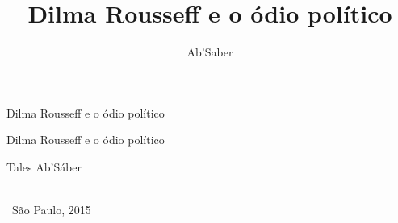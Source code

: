 \documentclass[showtrims,12pt]{memoir}
\author{Ab'Saber}
\title{Dilma Rousseff e o \'odio pol\'itico}
\begin{document}
\fontsize{13.5pt}{17.6}\selectfont
{}

\pagestyle{empty}

{\LARGE\centering\vspace*{6em}\thispagestyle{empty}
Dilma Rousseff e o \'odio pol\'itico\\

\vfill\pagebreak\par}

\blank

{\LARGE\centering\vspace*{6em}\thispagestyle{empty}
Dilma Rousseff e o \'odio pol\'itico\\\bigskip

\Large Tales Ab'S\'aber\\\bigskip


\vfill
\logoum\\
\ S\~ao Paulo, 2015
\pagebreak\par}




\pagebreak



\setcounter{tocdepth}{0}
\setcounter{secnumdepth}{-2}

\pagebreak\mbox{}\pagebreak\tableofcontents*

\pagestyle{estilo}

%








\end{document}
